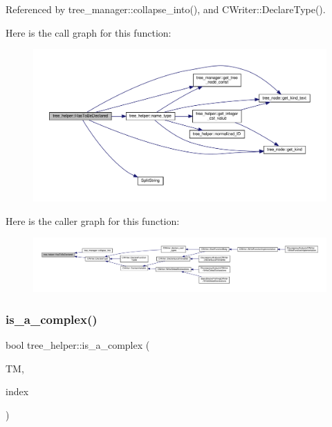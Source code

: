 Referenced by tree\+\_\+manager\+::collapse\+\_\+into(), and C\+Writer\+::\+Declare\+Type().

Here is the call graph for this function\+:
\nopagebreak
\begin{figure}[H]
\begin{center}
\leavevmode
\includegraphics[width=350pt]{d7/d99/classtree__helper_af222b2ac92c27b68a6b18308f200d0c8_cgraph}
\end{center}
\end{figure}
Here is the caller graph for this function\+:
\nopagebreak
\begin{figure}[H]
\begin{center}
\leavevmode
\includegraphics[width=350pt]{d7/d99/classtree__helper_af222b2ac92c27b68a6b18308f200d0c8_icgraph}
\end{center}
\end{figure}
\mbox{\label{classtree__helper_af7b886ed7c1bbaa4149b536830c5d16d}} 
\subsubsection{\texorpdfstring{is\+\_\+a\+\_\+complex()}{is\_a\_complex()}}
{\footnotesize\ttfamily bool tree\+\_\+helper\+::is\+\_\+a\+\_\+complex (\begin{DoxyParamCaption}\item[{const \hyperlink{tree__manager_8hpp_a792e3f1f892d7d997a8d8a4a12e39346}{tree\+\_\+manager\+Const\+Ref} \&}]{TM,  }\item[{const unsigned int}]{index }\end{DoxyParamCaption})\hspace{0.3cm}{\ttfamily [static]}}



